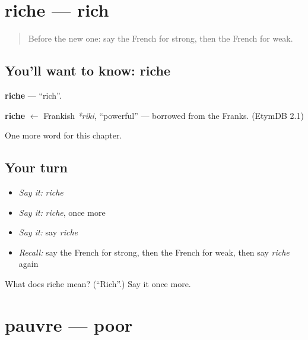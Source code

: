 \section[riche]{riche — rich}

\label{lesson:FR-C91-riche}



\begin{quote}
Before the new one: say the French for strong, then the French for weak.
\end{quote}

\subsection*{You'll want to know: riche}
\textbf{riche} — \textquotedblleft{}rich\textquotedblright{}.

\begin{cousinweb}
\textbf{riche} $\leftarrow$ Frankish \emph{*riki}, \textquotedblleft{}powerful\textquotedblright{} — borrowed from the Franks. (EtymDB 2.1)
\end{cousinweb}

\begin{grammarlens}[title={What you've built}]
One more word for this chapter.
\end{grammarlens}

\subsection*{Your turn}
\begin{itemize}
\raggedright
  \item \emph{Say it:} \emph{riche}
  \item \emph{Say it:} \emph{riche}, once more
  \item \emph{Say it:} say \emph{riche}
  \item \emph{Recall:} say the French for strong, then the French for weak, then say \emph{riche} again
\end{itemize}

\begin{tcolorbox}[breakable,colback=teal!4,colframe=teal!35!black,title={Before you move on}]
What does riche mean? (\textquotedblleft{}Rich\textquotedblright{}.) Say it once more.
\end{tcolorbox}
\section[pauvre]{pauvre — poor}


